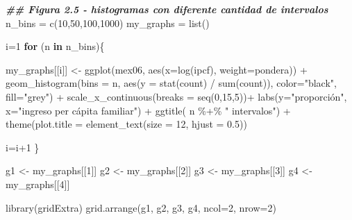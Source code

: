 \documentclass[
]{book}
\newenvironment{Shaded}{\begin{snugshade}}{\end{snugshade}}
\newcommand{\AttributeTok}[1]{\textcolor[rgb]{0.77,0.63,0.00}{#1}}
\newcommand{\ControlFlowTok}[1]{\textcolor[rgb]{0.13,0.29,0.53}{\textbf{#1}}}
\newcommand{\DecValTok}[1]{\textcolor[rgb]{0.00,0.00,0.81}{#1}}
\newcommand{\DocumentationTok}[1]{\textcolor[rgb]{0.56,0.35,0.01}{\textbf{\textit{#1}}}}
\newcommand{\FloatTok}[1]{\textcolor[rgb]{0.00,0.00,0.81}{#1}}
\newcommand{\FunctionTok}[1]{\textcolor[rgb]{0.00,0.00,0.00}{#1}}
\newcommand{\NormalTok}[1]{#1}
\newcommand{\OtherTok}[1]{\textcolor[rgb]{0.56,0.35,0.01}{#1}}
\newcommand{\SpecialCharTok}[1]{\textcolor[rgb]{0.00,0.00,0.00}{#1}}
\newcommand{\StringTok}[1]{\textcolor[rgb]{0.31,0.60,0.02}{#1}}
\begin{document}
\begin{Shaded}
\begin{Highlighting}[]
\DocumentationTok{\#\# Figura 2.5 {-} histogramas con diferente cantidad de intervalos}
\NormalTok{n\_bins }\OtherTok{=} \FunctionTok{c}\NormalTok{(}\DecValTok{10}\NormalTok{,}\DecValTok{50}\NormalTok{,}\DecValTok{100}\NormalTok{,}\DecValTok{1000}\NormalTok{)}
\NormalTok{my\_graphs }\OtherTok{=} \FunctionTok{list}\NormalTok{()}

\NormalTok{i}\OtherTok{=}\DecValTok{1}
\ControlFlowTok{for}\NormalTok{ (n }\ControlFlowTok{in}\NormalTok{ n\_bins)\{}
  
\NormalTok{    my\_graphs[[i]] }\OtherTok{\textless{}{-}} \FunctionTok{ggplot}\NormalTok{(mex06, }
                           \FunctionTok{aes}\NormalTok{(}\AttributeTok{x=}\FunctionTok{log}\NormalTok{(ipcf), }\AttributeTok{weight=}\NormalTok{pondera)) }\SpecialCharTok{+} 
                   \FunctionTok{geom\_histogram}\NormalTok{(}\AttributeTok{bins =}\NormalTok{ n, }\FunctionTok{aes}\NormalTok{(}\AttributeTok{y =} \FunctionTok{stat}\NormalTok{(count) }\SpecialCharTok{/} \FunctionTok{sum}\NormalTok{(count)),}
                               \AttributeTok{color=}\StringTok{"black"}\NormalTok{, }\AttributeTok{fill=}\StringTok{"grey"}\NormalTok{) }\SpecialCharTok{+}
                   \FunctionTok{scale\_x\_continuous}\NormalTok{(}\AttributeTok{breaks =} \FunctionTok{seq}\NormalTok{(}\DecValTok{0}\NormalTok{,}\DecValTok{15}\NormalTok{,}\DecValTok{5}\NormalTok{))}\SpecialCharTok{+}
                   \FunctionTok{labs}\NormalTok{(}\AttributeTok{y=}\StringTok{"proporción"}\NormalTok{, }\AttributeTok{x=}\StringTok{"ingreso per cápita familiar"}\NormalTok{) }\SpecialCharTok{+}
                   \FunctionTok{ggtitle}\NormalTok{( n }\SpecialCharTok{\%+\%} \StringTok{" intervalos"}\NormalTok{) }\SpecialCharTok{+}
                   \FunctionTok{theme}\NormalTok{(}\AttributeTok{plot.title =} \FunctionTok{element\_text}\NormalTok{(}\AttributeTok{size =} \DecValTok{12}\NormalTok{, }\AttributeTok{hjust =} \FloatTok{0.5}\NormalTok{))}

\NormalTok{  i}\OtherTok{=}\NormalTok{i}\SpecialCharTok{+}\DecValTok{1}  
\NormalTok{\}}

\NormalTok{g1 }\OtherTok{\textless{}{-}}\NormalTok{  my\_graphs[[}\DecValTok{1}\NormalTok{]]}
\NormalTok{g2 }\OtherTok{\textless{}{-}}\NormalTok{  my\_graphs[[}\DecValTok{2}\NormalTok{]]}
\NormalTok{g3 }\OtherTok{\textless{}{-}}\NormalTok{  my\_graphs[[}\DecValTok{3}\NormalTok{]]}
\NormalTok{g4 }\OtherTok{\textless{}{-}}\NormalTok{  my\_graphs[[}\DecValTok{4}\NormalTok{]]}

\FunctionTok{library}\NormalTok{(gridExtra)}
\FunctionTok{grid.arrange}\NormalTok{(g1, g2, g3, g4, }\AttributeTok{ncol=}\DecValTok{2}\NormalTok{, }\AttributeTok{nrow=}\DecValTok{2}\NormalTok{)}
\end{Highlighting}
\end{Shaded}
\end{document}

